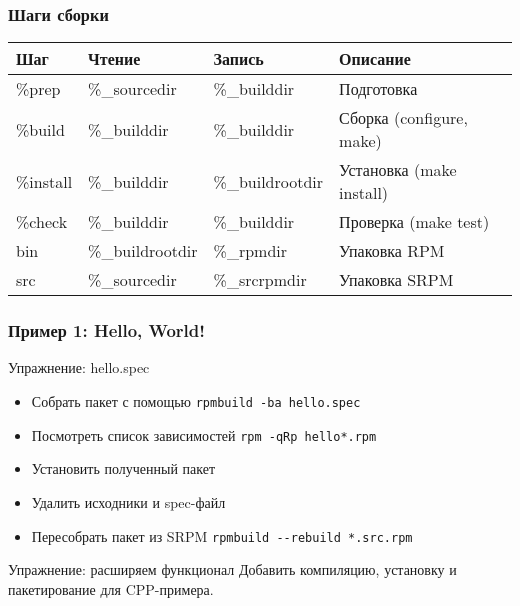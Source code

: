 \begin{frame}
	\frametitle{Шаги сборки}	
	
			\begin{table}
				\begin{tabular}{l | l | l | l }
				Шаг & Чтение & Запись & Описание \\
				\hline 
				\%prep & \%\_sourcedir & \%\_builddir & Подготовка\\
				\%build & \%\_builddir & \%\_builddir & Сборка (configure, make)\\
				\%install & \%\_builddir & \%\_buildrootdir & Установка (make install)\\
				\%check &	\%\_builddir & \%\_builddir & Проверка (make test)\\
				\hline 
				bin & \%\_buildrootdir	&\%\_rpmdir & Упаковка RPM\\
				src & \%\_sourcedir & \%\_srcrpmdir & Упаковка SRPM\\
				\end{tabular}
			\end{table}			
\end{frame}

\begin{frame}
	\frametitle{Пример 1: Hello, World!}

	\begin{block}{Упражнение: hello.spec}
		\begin{itemize}
			\item Собрать пакет с помощью {\tt rpmbuild -ba hello.spec}
			\item Посмотреть список зависимостей {\tt rpm -qRp hello*.rpm}
			\item Установить полученный пакет
			\item Удалить исходники и spec-файл
			\item Пересобрать пакет из SRPM {\tt rpmbuild -{}-rebuild *.src.rpm}
		\end{itemize}
	\end{block}

	\pause

	\begin{block}{Упражнение: расширяем функционал}
		Добавить компиляцию, установку и пакетирование для CPP-примера.
	\end{block}

\end{frame}

